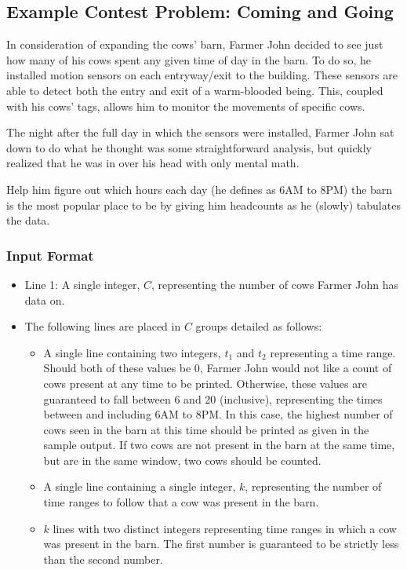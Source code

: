 \subsection{Example Contest Problem: Coming and Going}

In consideration of expanding the cows' barn, Farmer John decided to see just how many of his cows spent any given time of day in the barn.
To do so, he installed motion sensors on each entryway/exit to the building.
These sensors are able to detect both the entry and exit of a warm-blooded being.
This, coupled with his cows' tags, allows him to monitor the movements of specific cows.

The night after the full day in which the sensors were installed, Farmer John sat down to do what he thought was some straightforward analysis, but quickly realized that he was in over his head with only mental math.

Help him figure out which hours each day (he defines as 6AM to 8PM) the barn is the most popular place to be by giving him headcounts as he (slowly) tabulates the data.

\subsubsection{Input Format}

\begin{itemize}
    \item Line 1: A single integer, $C$, representing the number of cows Farmer John has data on.

    \item The following lines are placed in $C$ groups detailed as follows:
    \begin{itemize}
        \item A single line containing two integers, $t_1$ and $t_2$ representing a time range.
        Should both of these values be 0, Farmer John would not like a count of cows present at any time to be printed.
        Otherwise, these values are guaranteed to fall between 6 and 20 (inclusive), representing the times between and including 6AM to 8PM.
        In this case, the highest number of cows seen in the barn at this time should be printed as given in the sample output.
        If two cows are not present in the barn at the same time, but are in the same window, two cows should be counted.

        \item A single line containing a single integer, $k$, representing the number of time ranges to follow that a cow was present in the barn.

        \item $k$ lines with two distinct integers representing time ranges in which a cow was present in the barn.
        The first number is guaranteed to be strictly less than the second number.
    \end{itemize}
\end{itemize}

